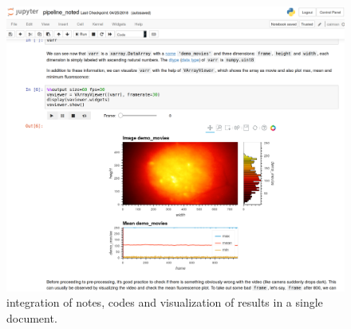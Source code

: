 \documentclass[master.tex]{subfiles}
\begin{document}
\begin{figure}
  \centering \includegraphics[scale = .13]{Figures/prelim_minian.png}
  \caption{\footnotesize integration of notes, codes and visualization of
  results in a single document.}
  \label{fig:prelim_minian}
\end{figure}

\end{document}

